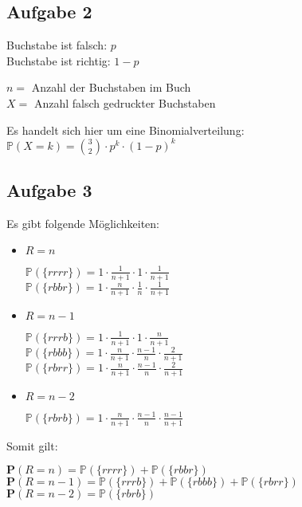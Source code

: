 \documentclass[10pt,a4paper,parskip=half]{scrartcl}
\begin{document}
\subsection*{Aufgabe 2}
Buchstabe ist falsch: $p$\\
Buchstabe ist richtig: $1-p$

$n = $ Anzahl der Buchstaben im Buch\\
$X = $ Anzahl falsch gedruckter Buchstaben

Es handelt sich hier um eine Binomialverteilung: \\
$\mathbb P (X = k) = {3 \choose 2} \cdot p^k \cdot (1-p)^k$

\subsection*{Aufgabe 3}
Es gibt folgende Möglichkeiten:

\begin{itemize}
\item $R=n$

$\mathbb P (\{rrrr\}) = 1 \cdot\frac 1 {n+1} \cdot 1 \cdot \frac 1 {n+1}$\\
$\mathbb P (\{rbbr\}) = 1 \cdot\frac n {n+1} \cdot \frac {1} n \cdot \frac 1 {n+1}$\\
\item $R=n-1$

$\mathbb P (\{rrrb\}) = 1 \cdot\frac 1 {n+1} \cdot 1 \cdot \frac n {n+1}$\\
$\mathbb P (\{rbbb\}) = 1 \cdot\frac n {n+1} \cdot \frac {n-1} n \cdot \frac 2 {n+1}$\\
$\mathbb P (\{rbrr\}) = 1 \cdot\frac n {n+1} \cdot \frac {n-1} n \cdot \frac 2 {n+1}$\\
\item $R=n-2$

$\mathbb P (\{rbrb\}) = 1 \cdot\frac n {n+1} \cdot \frac {n-1} n \cdot \frac {n-1} {n+1}$\\
\end{itemize}

Somit gilt:

$\mathbf P(R=n) = \mathbb P (\{rrrr\}) + \mathbb P (\{rbbr\})$\\
$\mathbf P(R=n-1) = \mathbb P (\{rrrb\}) + \mathbb P (\{rbbb\}) + \mathbb P (\{rbrr\})$\\
$\mathbf P(R=n-2) = \mathbb P (\{rbrb\})$
\end{document}
